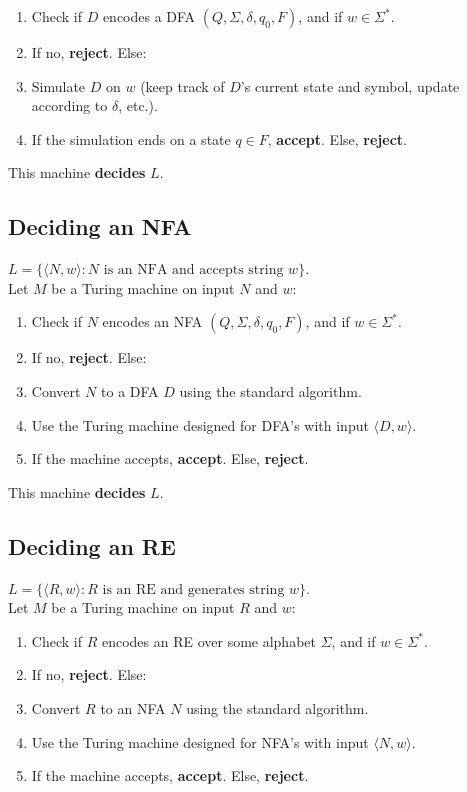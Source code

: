 \documentclass[12pt]{article}
\begin{document}
\begin{enumerate}
    \item Check if $D$ encodes a DFA $(Q, \Sigma, \delta, q_0, F)$, and if $w \in \Sigma^*$.
    \item If no, \textbf{reject}. Else:
    \item Simulate $D$ on $w$ (keep track of $D$'s current state and symbol, update according to $\delta$, etc.).
    \item If the simulation ends on a state $q \in F$, \textbf{accept}. Else, \textbf{reject}.
\end{enumerate}

\noindent
This machine \textbf{decides} $L$.

\subsection*{Deciding an NFA}
$L = \{\langle N, w \rangle : N \text{ is an NFA and accepts string } w\}$.\\
Let $M$ be a Turing machine on input $N$ and $w$:

\begin{enumerate}
    \item Check if $N$ encodes an NFA $(Q, \Sigma, \delta, q_0, F)$, and if $w \in \Sigma^*$.
    \item If no, \textbf{reject}. Else:
    \item Convert $N$ to a DFA $D$ using the standard algorithm.
    \item Use the Turing machine designed for DFA's with input $\langle D, w \rangle$.
    \item If the machine accepts, \textbf{accept}. Else, \textbf{reject}.
\end{enumerate}

\noindent
This machine \textbf{decides} $L$.

\subsection*{Deciding an RE}
$L = \{\langle R, w \rangle : R \text{ is an RE and generates string } w\}$.\\
Let $M$ be a Turing machine on input $R$ and $w$:

\begin{enumerate}
    \item Check if $R$ encodes an RE over some alphabet $\Sigma$, and if $w \in \Sigma^*$.
    \item If no, \textbf{reject}. Else:
    \item Convert $R$ to an NFA $N$ using the standard algorithm.
    \item Use the Turing machine designed for NFA's with input $\langle N, w \rangle$.
    \item If the machine accepts, \textbf{accept}. Else, \textbf{reject}.
\end{enumerate}
\end{document}
